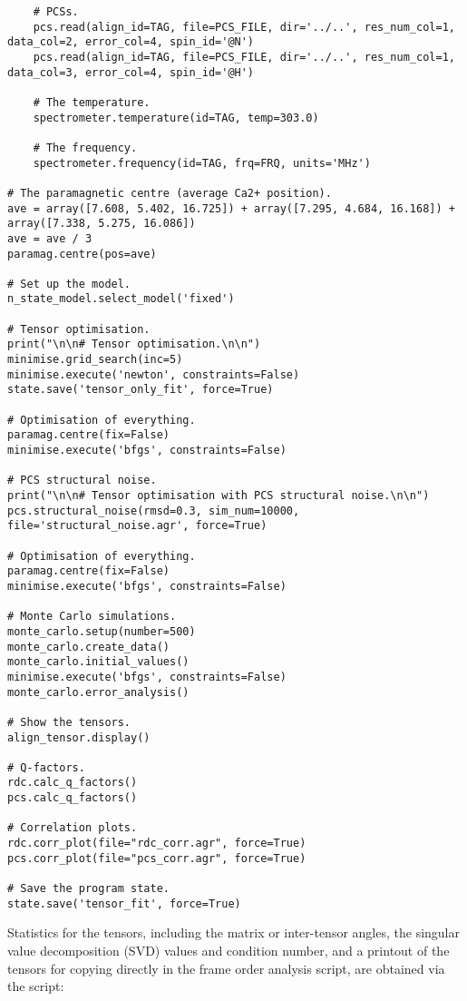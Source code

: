 \begin{lstlisting}
    # PCSs.
    pcs.read(align_id=TAG, file=PCS_FILE, dir='../..', res_num_col=1, data_col=2, error_col=4, spin_id='@N')
    pcs.read(align_id=TAG, file=PCS_FILE, dir='../..', res_num_col=1, data_col=3, error_col=4, spin_id='@H')

    # The temperature.
    spectrometer.temperature(id=TAG, temp=303.0)

    # The frequency.
    spectrometer.frequency(id=TAG, frq=FRQ, units='MHz')

# The paramagnetic centre (average Ca2+ position).
ave = array([7.608, 5.402, 16.725]) + array([7.295, 4.684, 16.168]) + array([7.338, 5.275, 16.086])
ave = ave / 3
paramag.centre(pos=ave)

# Set up the model.
n_state_model.select_model('fixed')

# Tensor optimisation.
print("\n\n# Tensor optimisation.\n\n")
minimise.grid_search(inc=5)
minimise.execute('newton', constraints=False)
state.save('tensor_only_fit', force=True)

# Optimisation of everything.
paramag.centre(fix=False)
minimise.execute('bfgs', constraints=False)

# PCS structural noise.
print("\n\n# Tensor optimisation with PCS structural noise.\n\n")
pcs.structural_noise(rmsd=0.3, sim_num=10000, file='structural_noise.agr', force=True)

# Optimisation of everything.
paramag.centre(fix=False)
minimise.execute('bfgs', constraints=False)

# Monte Carlo simulations.
monte_carlo.setup(number=500)
monte_carlo.create_data()
monte_carlo.initial_values()
minimise.execute('bfgs', constraints=False)
monte_carlo.error_analysis()

# Show the tensors.
align_tensor.display()

# Q-factors.
rdc.calc_q_factors()
pcs.calc_q_factors()

# Correlation plots.
rdc.corr_plot(file="rdc_corr.agr", force=True)
pcs.corr_plot(file="pcs_corr.agr", force=True)

# Save the program state.
state.save('tensor_fit', force=True)
\end{lstlisting}

Statistics for the tensors, including the matrix or inter-tensor angles, the singular value decomposition (SVD) values and condition number, and a printout of the tensors for copying directly in the frame order analysis script, are obtained via the script:


